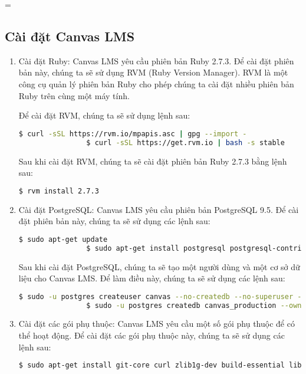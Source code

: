 =\documentclass[../Thesis.tex]{subfiles}
\begin{document}
    \subsection{Cài đặt Canvas LMS}
        \begin{enumerate}
            \item Cài đặt Ruby: Canvas LMS yêu cầu phiên bản Ruby 2.7.3. Để cài đặt phiên bản này, chúng ta sẽ sử dụng RVM (Ruby Version Manager). RVM là một công cụ quản lý phiên bản Ruby cho phép chúng ta cài đặt nhiều phiên bản Ruby trên cùng một máy tính.

            Để cài đặt RVM, chúng ta sẽ sử dụng lệnh sau:
            \begin{lstlisting}[language=bash]
                $ curl -sSL https://rvm.io/mpapis.asc | gpg --import -
                $ curl -sSL https://get.rvm.io | bash -s stable
            \end{lstlisting}

            Sau khi cài đặt RVM, chúng ta sẽ cài đặt phiên bản Ruby 2.7.3 bằng lệnh sau:
            \begin{lstlisting}[language=bash]
                $ rvm install 2.7.3
            \end{lstlisting}

            \item Cài đặt PostgreSQL: Canvas LMS yêu cầu phiên bản PostgreSQL 9.5. Để cài đặt phiên bản này, chúng ta sẽ sử dụng các lệnh sau:
            \begin{lstlisting}[language=bash]
                $ sudo apt-get update
                $ sudo apt-get install postgresql postgresql-contrib
            \end{lstlisting}

            Sau khi cài đặt PostgreSQL, chúng ta sẽ tạo một người dùng và một cơ sở dữ liệu cho Canvas LMS. Để làm điều này, chúng ta sẽ sử dụng các lệnh sau:
            \begin{lstlisting}[language=bash]
                $ sudo -u postgres createuser canvas --no-createdb --no-superuser --no-createrole --pwprompt
                $ sudo -u postgres createdb canvas_production --owner=canvas
            \end{lstlisting}

            \item Cài đặt các gói phụ thuộc: Canvas LMS yêu cầu một số gói phụ thuộc để có thể hoạt động. Để cài đặt các gói phụ thuộc này, chúng ta sẽ sử dụng các lệnh sau:
            \begin{lstlisting}[language=bash]
                $ sudo apt-get install git-core curl zlib1g-dev build-essential libssl-dev libreadline-dev libyaml-dev libsqlite3-dev sqlite3 libxml2-dev libxslt1-dev libcurl4-openssl-dev software-properties-common libffi-dev
            \end{lstlisting}


\end{enumerate}
\end{document}

